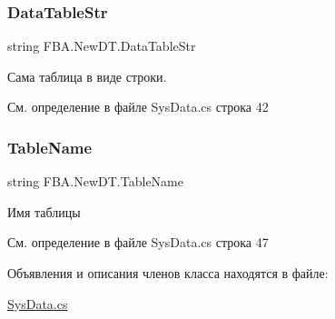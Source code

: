 \subsubsection{\texorpdfstring{Data\+Table\+Str}{DataTableStr}}
{\footnotesize\ttfamily string F\+B\+A.\+New\+D\+T.\+Data\+Table\+Str}



Сама таблица в виде строки. 



См. определение в файле Sys\+Data.\+cs строка 42

\mbox{\label{class_f_b_a_1_1_new_d_t_a67b57ab947b18dd83e77f9499ab0d216}} 
\subsubsection{\texorpdfstring{Table\+Name}{TableName}}
{\footnotesize\ttfamily string F\+B\+A.\+New\+D\+T.\+Table\+Name}



Имя таблицы 



См. определение в файле Sys\+Data.\+cs строка 47



Объявления и описания членов класса находятся в файле\+:\begin{DoxyCompactItemize}
\item 
\mbox{\hyperlink{_sys_data_8cs}{Sys\+Data.\+cs}}\end{DoxyCompactItemize}
